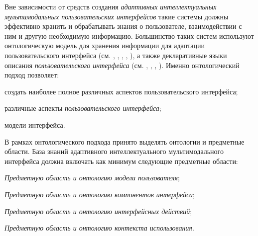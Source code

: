 Вне зависимости от средств создания \textit{адаптивных интеллектуальных мультимодальных пользовательских интерфейсов} такие системы должны эффективно хранить и обрабатывать знания о пользователе, взаимодействии с ним и другую необходимую информацию. Большинство таких систем используют онтологическую модель для хранения информации для адаптации пользовательского интерфейса (см. , , , , ), а также декларативные языки описания \textit{пользовательского интерфейса} (см. , , , ). Именно онтологический подход позволяет:
\begin{textitemize}
	\item создать наиболее полное  различных аспектов пользовательского интерфейса;
	\item {} различные аспекты \textit{пользовательского интерфейса};
	\item {} модели интерфейса.
\end{textitemize}

В рамках онтологического подхода принято выделять онтологии и предметные области. База знаний адаптивного интеллектуального мультимодального интерфейса должна включать как минимум следующие предметные области:
\begin{textitemize}
	\item \textit{Предметную область и онтологию модели пользователя}; 
	\item \textit{Предметную область и онтологию компонентов интерфейса};
	\item \textit{Предметную область и онтологию интерфейсных действий};
	\item \textit{Предметную область и онтологию контекста использования}.
\end{textitemize}

